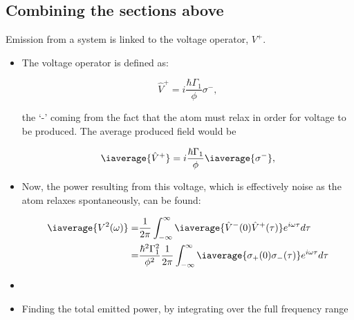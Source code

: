 \subsection{Combining the sections above}
 Emission from a system is linked to the voltage operator, $ V^{+} $.
 \begin{itemize}
 	\item The voltage operator is defined as:
 	
 	\begin{equation}\label{feb22018}
 	\hat{V}^{+} = i\frac{\hbar\Gamma_1}{\phi}\sigma^{-},
 	\end{equation}
 	
 	\noindent the `-' coming from the fact that the atom must relax in order for voltage to be produced. The average produced field would be
 	
 	\[
 	\iaverage{\hat{V}^{+}} = i\frac{\hbar\Gamma_1}{\phi}\iaverage{\sigma^{-}},
 	\]
 	
 	\item Now, the power resulting from this voltage, which is effectively noise as the atom relaxes spontaneously, can be found:
 	
 	\begin{equation}\label{feb22018:1}
 	\begin{aligned}
 	\iaverage{V^2(\omega)} = & \frac{1}{2\pi}\int_{-\infty}^{\infty}\iaverage{\hat{V}^{-}(0)\hat{V}^{+}(\tau)}e^{i\omega \tau}d\tau\\
 	= & \frac{\hbar^2\Gamma_1^{2}}{\phi^2}\frac{1}{2\pi}\int_{-\infty}^{\infty}\iaverage{\sigma_{+}(0)\sigma_{-}(\tau)}e^{i\omega \tau}d\tau
 	\end{aligned}
 	\end{equation}
 	
 	\item {} 
 	
 	\item Finding the total emitted power, by integrating over the full frequency range 
 	

\end{itemize}
